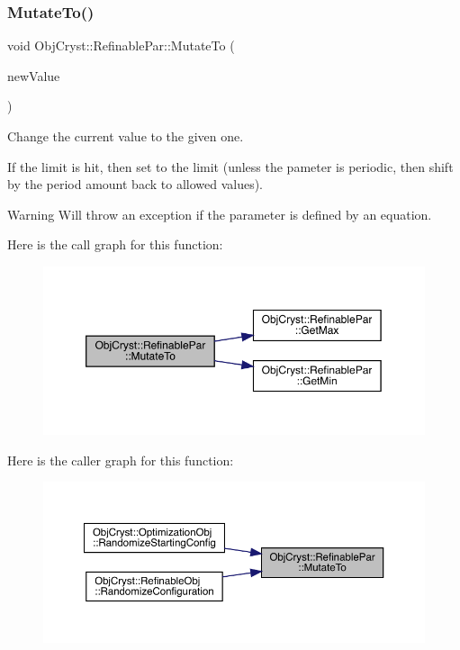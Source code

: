 \subsubsection{\texorpdfstring{MutateTo()}{MutateTo()}}
{\footnotesize\ttfamily void Obj\+Cryst\+::\+Refinable\+Par\+::\+Mutate\+To (\begin{DoxyParamCaption}\item[{const R\+E\+AL}]{new\+Value }\end{DoxyParamCaption})}

Change the current value to the given one.

If the limit is hit, then set to the limit (unless the pameter is periodic, then shift by the period amount back to allowed values). \begin{DoxyWarning}{Warning}
Will throw an exception if the parameter is defined by an equation. 
\end{DoxyWarning}
Here is the call graph for this function\+:
\nopagebreak
\begin{figure}[H]
\begin{center}
\leavevmode
\includegraphics[width=350pt]{class_obj_cryst_1_1_refinable_par_a696f87a0a129cfd270144532d664d093_cgraph}
\end{center}
\end{figure}
Here is the caller graph for this function\+:
\nopagebreak
\begin{figure}[H]
\begin{center}
\leavevmode
\includegraphics[width=350pt]{class_obj_cryst_1_1_refinable_par_a696f87a0a129cfd270144532d664d093_icgraph}
\end{center}
\end{figure}
\mbox{\label{class_obj_cryst_1_1_refinable_par_afb15606bb24a5fbb144d07843bb11f97}} 
